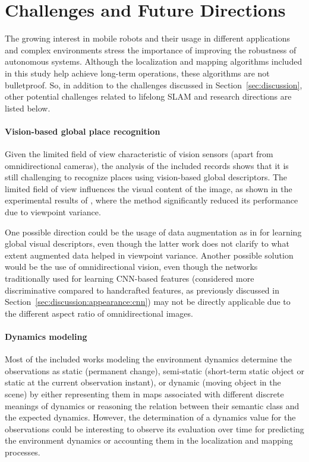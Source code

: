 \section{Challenges and Future Directions}
\label{sec:future}

The growing interest in mobile robots and their usage in different applications and complex environments stress the importance of improving the robustness of autonomous systems. Although the localization and mapping algorithms included in this study help achieve long-term operations, these algorithms are not bulletproof.
So, in addition to the challenges discussed in Section~\ref{sec:discussion}, other potential challenges related to lifelong SLAM and research directions are listed below.



\paragraph{Vision-based global place recognition}

Given the limited field of view characteristic of vision sensors (apart from omnidirectional cameras), the analysis of the included records shows that it is still challenging to recognize places using vision-based global descriptors.
The limited field of view influences the visual content of the image, as shown in the experimental results of \cite{qin-et-al:2020:103561}, where the method significantly reduced its performance due to viewpoint variance.

One possible direction could be the usage of data augmentation as in \cite{tang-et-al:2021:17298814211037497} for learning global visual descriptors, even though the latter work does not clarify to what extent augmented data helped in viewpoint variance.
Another possible solution would be the use of omnidirectional vision, even though the networks traditionally used for learning CNN-based features (considered more discriminative compared to handcrafted features, as previously discussed in Section~\ref{sec:discussion:appearance:cnn}) may not be directly applicable due to the different aspect ratio of omnidirectional images.



\paragraph{Dynamics modeling}

Most of the included works modeling the environment dynamics determine the observations as static (permanent change), semi-static (short-term static object or static at the current observation instant), or dynamic (moving object in the scene) by either representing them in maps associated with different discrete meanings of dynamics or reasoning the relation between their semantic class and the expected dynamics. However, the determination of a dynamics value for the observations could be interesting to observe its evaluation over time for predicting the environment dynamics or accounting them in the localization and mapping processes.


